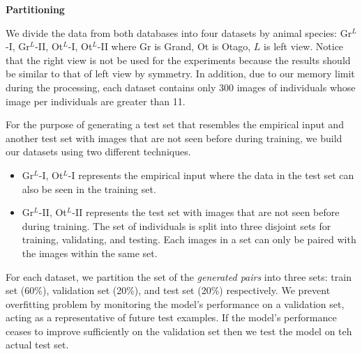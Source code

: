 \textbf{Partitioning}

We divide the data from both databases into four datasets by animal species:
Gr$^{L}$-I, Gr$^{L}$-II, Ot$^{L}$-I, Ot$^{L}$-II where Gr is Grand, Ot is
Otago, $L$ is left view. Notice that the right view is not be used for the
experiments because the results should be similar to that of left view by
symmetry. In addition, due to our memory limit during the processing, each
dataset contains only 300 images of individuals whose image per individuals are
greater than 11.

For the purpose of generating a test set that resembles the empirical input and
another test set with images that are not seen before during training, we build
our datasets using two different techniques.
\begin{itemize}
  \item Gr$^{L}$-I, Ot$^{L}$-I represents the empirical input where the data in
  the test set can also be seen in the training set.
  \item Gr$^{L}$-II, Ot$^{L}$-II represents the test set with images that are
  not seen before during training. The set of individuals is split into three
  disjoint sets for training, validating, and testing. Each images in a set can
  only be paired with the images within the same set.
\end{itemize}

For each dataset, we partition the set of the \emph{generated pairs} into three
sets: train set (60\%), validation set (20\%), and test set (20\%) respectively.
We prevent overfitting problem by monitoring the model's performance on a
validation set, acting as a representative of future test examples. If the
model's performance ceases to improve sufficiently on the validation set then
we test the model on teh actual test set.


